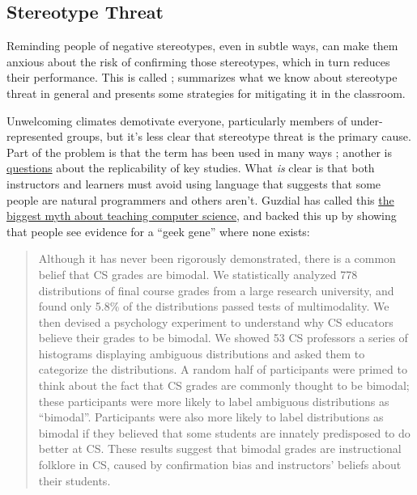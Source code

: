 \subsection*{Stereotype Threat}

Reminding people of negative stereotypes, even in subtle ways, can make
them anxious about the risk of confirming those stereotypes, which in
turn reduces their performance. This is called
; \cite{Stee2011}
summarizes what we know about stereotype threat in general and presents
some strategies for mitigating it in the classroom.

Unwelcoming climates demotivate everyone, particularly members of
under-represented groups, but it's less clear that stereotype threat
is the primary cause. Part of the problem is that the term has been
used in many ways \cite{Shap2007}; another is
\href{https://www.psychologytoday.com/blog/rabble-rouser/201512/is-stereotype-threat-overcooked-overstated-and-oversold}{questions} about the replicability of
key studies. What \emph{is} clear is that both instructors and learners
must avoid using language that suggests that some people are natural
programmers and others aren't. Guzdial has called this \href{https://cacm.acm.org/blogs/blog-cacm/189498-top-10-myths-about-teaching-computer-science/fulltext}{the biggest
myth about teaching computer science}, and
\cite{Pati2016} backed this up by showing that people see evidence
for a ``geek gene'' where none exists:

\begin{quote}

Although it has never been rigorously demonstrated, there is a common
belief that CS grades are bimodal. We statistically analyzed 778
distributions of final course grades from a large research university,
and found only 5.8\% of the distributions passed tests of
multimodality. We then devised a psychology experiment to understand
why CS educators believe their grades to be bimodal. We showed 53 CS
professors a series of histograms displaying ambiguous distributions
and asked them to categorize the distributions. A random half of
participants were primed to think about the fact that CS grades are
commonly thought to be bimodal; these participants were more likely to
label ambiguous distributions as ``bimodal''. Participants were also
more likely to label distributions as bimodal if they believed that
some students are innately predisposed to do better at CS. These
results suggest that bimodal grades are instructional folklore in CS,
caused by confirmation bias and instructors' beliefs about their
students.

\end{quote}

